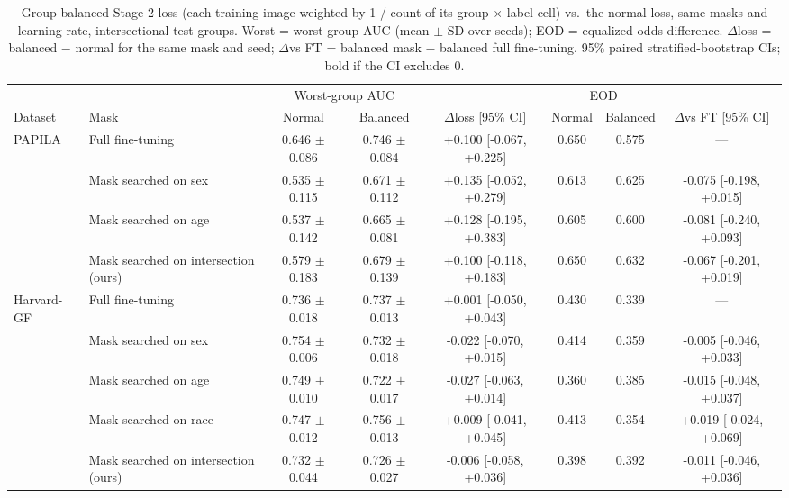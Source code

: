 \begin{table}[t]
\centering
\caption{Group-balanced Stage-2 loss (each training image weighted by 1 / count of its group $\times$ label cell) vs.\ the normal loss, same masks and learning rate, intersectional test groups. Worst = worst-group AUC (mean $\pm$ SD over seeds); EOD = equalized-odds difference. $\Delta$loss = balanced $-$ normal for the same mask and seed; $\Delta$vs FT = balanced mask $-$ balanced full fine-tuning. 95\% paired stratified-bootstrap CIs; bold if the CI excludes 0.}
\label{tab:balanced}
\small
\begin{tabular}{llcccccc}
\toprule
 & & \multicolumn{2}{c}{Worst-group AUC} & & \multicolumn{2}{c}{EOD} & \\
\cmidrule(lr){3-4}\cmidrule(lr){6-7}
Dataset & Mask & Normal & Balanced & $\Delta$loss [95\% CI] & Normal & Balanced & $\Delta$vs FT [95\% CI] \\
\midrule
PAPILA & Full fine-tuning & 0.646 $\pm$ 0.086 & 0.746 $\pm$ 0.084 & +0.100 [-0.067, +0.225] & 0.650 & 0.575 & --- \\
 & Mask searched on sex & 0.535 $\pm$ 0.115 & 0.671 $\pm$ 0.112 & +0.135 [-0.052, +0.279] & 0.613 & 0.625 & -0.075 [-0.198, +0.015] \\
 & Mask searched on age & 0.537 $\pm$ 0.142 & 0.665 $\pm$ 0.081 & +0.128 [-0.195, +0.383] & 0.605 & 0.600 & -0.081 [-0.240, +0.093] \\
 & Mask searched on intersection (ours) & 0.579 $\pm$ 0.183 & 0.679 $\pm$ 0.139 & +0.100 [-0.118, +0.183] & 0.650 & 0.632 & -0.067 [-0.201, +0.019] \\
\midrule
Harvard-GF & Full fine-tuning & 0.736 $\pm$ 0.018 & 0.737 $\pm$ 0.013 & +0.001 [-0.050, +0.043] & 0.430 & 0.339 & --- \\
 & Mask searched on sex & 0.754 $\pm$ 0.006 & 0.732 $\pm$ 0.018 & -0.022 [-0.070, +0.015] & 0.414 & 0.359 & -0.005 [-0.046, +0.033] \\
 & Mask searched on age & 0.749 $\pm$ 0.010 & 0.722 $\pm$ 0.017 & -0.027 [-0.063, +0.014] & 0.360 & 0.385 & -0.015 [-0.048, +0.037] \\
 & Mask searched on race & 0.747 $\pm$ 0.012 & 0.756 $\pm$ 0.013 & +0.009 [-0.041, +0.045] & 0.413 & 0.354 & +0.019 [-0.024, +0.069] \\
 & Mask searched on intersection (ours) & 0.732 $\pm$ 0.044 & 0.726 $\pm$ 0.027 & -0.006 [-0.058, +0.036] & 0.398 & 0.392 & -0.011 [-0.046, +0.036] \\
\bottomrule
\end{tabular}
\end{table}
